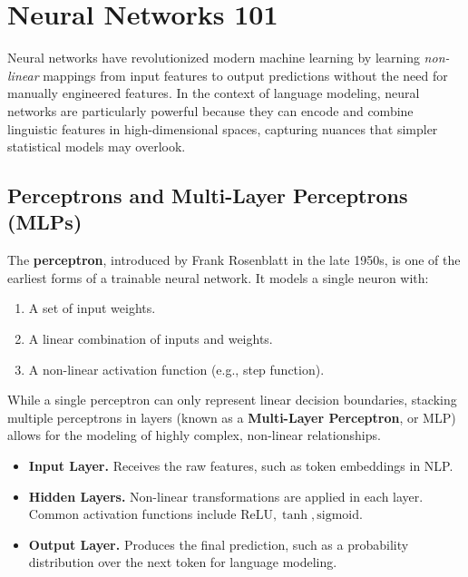 \section{Neural Networks 101}
\label{sec:neural_networks_101}

\noindent
Neural networks have revolutionized modern machine learning by learning \emph{non-linear} mappings from input features to output predictions without the need for manually engineered features. In the context of language modeling, neural networks are particularly powerful because they can encode and combine linguistic features in high-dimensional spaces, capturing nuances that simpler statistical models may overlook.

\subsection{Perceptrons and Multi-Layer Perceptrons (MLPs)}
\noindent
The \textbf{perceptron}, introduced by Frank Rosenblatt in the late 1950s, is one of the earliest forms of a trainable neural network. It models a single neuron with:
\begin{enumerate}
    \item A set of input weights.
    \item A linear combination of inputs and weights.
    \item A non-linear activation function (e.g., step function).
\end{enumerate}
While a single perceptron can only represent linear decision boundaries, stacking multiple perceptrons in layers (known as a \textbf{Multi-Layer Perceptron}, or MLP) allows for the modeling of highly complex, non-linear relationships.

\begin{itemize}
    \item \textbf{Input Layer.} Receives the raw features, such as token embeddings in NLP.
    \item \textbf{Hidden Layers.} Non-linear transformations are applied in each layer. Common activation functions include $\text{ReLU}, \tanh, \text{sigmoid}$.
    \item \textbf{Output Layer.} Produces the final prediction, such as a probability distribution over the next token for language modeling.
\end{itemize}

